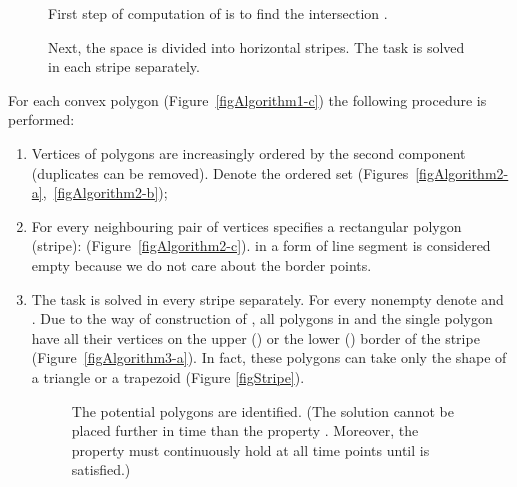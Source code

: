 \begin{enumerate}
	
	
\begin{figure}[h]
   \centering  
      	\caption{First step of computation of  is to find the intersection .}
	\label{figAlgorithm1}    
    
\end{figure}	

\begin{figure}[h]
   \centering  
      	\caption{Next, the space is divided into horizontal stripes. The task is solved in each stripe separately.}
	\label{figAlgorithm2}    
    
\end{figure}
	
	For each convex polygon  (Figure~\ref{figAlgorithm1-c}) the following procedure is performed:
		 \begin{enumerate}
			\item Vertices of polygons  are increasingly ordered by the second component  (duplicates can be removed). Denote the ordered set  (Figures~\ref{figAlgorithm2-a},~\ref{figAlgorithm2-b});
			\item For  every neighbouring pair of vertices  specifies a rectangular polygon (stripe):  (Figure~\ref{figAlgorithm2-c}). 
			 in a form of line segment is considered empty because we do not care about the border points.


			\item The task is solved in every stripe  separately. For every nonempty  denote  and . Due to the way of construction of , all polygons in  and the single polygon  have all their vertices on the upper () or the lower () border of the stripe  (Figure~\ref{figAlgorithm3-a}). In fact, these polygons can take only the shape of a triangle or a trapezoid (Figure \ref{figStripe}).\\
			
\begin{figure}[h]
   \centering  
      	\caption{The potential polygons are identified. (The solution cannot be placed further in time than the property . Moreover, the property  must continuously hold at all time points until  is satisfied.)}
	\label{figAlgorithm3}    
    

\end{figure}
\end{enumerate}
\end{enumerate}
